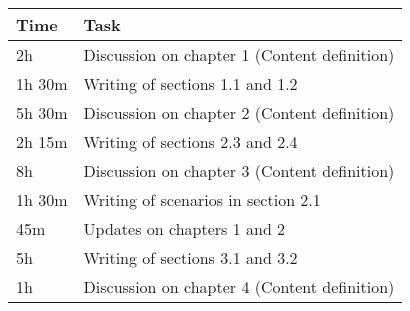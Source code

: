 \begin{center}
    {\renewcommand{\arraystretch}{2}%
    \begin{tabular}{L{2cm}L{12cm}}
        \hline
        \textbf{Time} & \textbf{Task} \\
        \hline
        2h & Discussion on chapter 1 (Content definition) \\
        \hline
        1h 30m & Writing of sections 1.1 and 1.2 \\
        \hline
        5h 30m & Discussion on chapter 2 (Content definition) \\
        \hline
        2h 15m & Writing of sections 2.3 and 2.4 \\
        \hline
        8h & Discussion on chapter 3 (Content definition) \\
        \hline
        1h 30m & Writing of scenarios in section 2.1 \\
        \hline
        45m & Updates on chapters 1 and 2 \\
        \hline
        5h & Writing of sections 3.1 and 3.2 \\
        \hline
        1h & Discussion on chapter 4 (Content definition) \\
        \hline
    \end{tabular}}
\end{center}